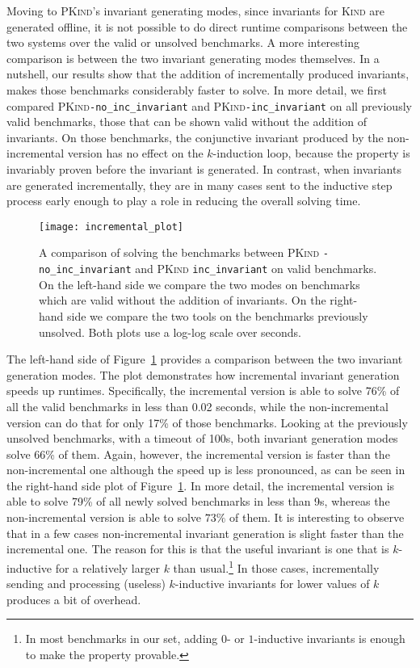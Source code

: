 \documentclass[submission,copyright,creativecommons]{eptcs}
\newcommand{\Kind}{\textrm{\textsc{Kind}}\xspace}
\newcommand{\PKind}{\textrm{\textsc{PKind}}\xspace}
\begin{document}
Moving to \PKind's invariant generating modes,
since invariants for \Kind are generated offline,
it is not possible to do direct runtime comparisons 
between the two systems over the valid or unsolved benchmarks.
A more interesting comparison is between 
the two invariant generating modes themselves.
In a nutshell, our results show that 
the addition of incrementally produced invariants, 
makes those benchmarks considerably faster to solve.  
In more detail,
we first compared \PKind \texttt{\small -no\_inc\_invariant} and 
\PKind \texttt{\small -inc\_invariant} on all previously valid benchmarks,
those that can be shown valid without the addition of invariants. 
On those benchmarks, the conjunctive invariant produced 
by the non-incremental version has no effect on the $k$-induction loop,
because the property is invariably proven before the invariant is generated.
In contrast, when invariants are generated incrementally, 
they are in many cases sent to the inductive step process
early enough to play a role in reducing the overall solving time.




\begin{figure}[t]
\centering
\texttt{[image: incremental\_plot]} 
\caption{ A comparison of solving the benchmarks between \PKind
  \texttt{\small -no\_inc\_invariant} and \PKind
  \texttt{\small inc\_invariant} on valid benchmarks. On the left-hand side
  we compare the two modes on benchmarks which are valid without the
  addition of invariants.  On the right-hand side we compare the two
  tools on the benchmarks previously unsolved.
  Both plots use a log-log scale over seconds.}
\label{fig:incremental}
\end{figure}

The left-hand side of Figure~\ref{fig:incremental} provides a
comparison between the two invariant generation modes. The plot demonstrates how
incremental invariant generation speeds up runtimes. 
Specifically, the incremental version is able to solve
76\% of all the valid benchmarks in less than 0.02 seconds, while the
non-incremental version can do that for only 17\% of those benchmarks.
Looking at the previously unsolved benchmarks, with a timeout of 100s, 
both invariant generation modes solve 66\% of them.  Again, however, the
incremental version is faster than the non-incremental one
although the speed up is less pronounced,
as can be seen in the right-hand side plot of Figure~\ref{fig:incremental}. 
In more detail, the incremental version is able to solve 79\% of all newly
solved benchmarks in less than 9s, whereas the non-incremental version
is able to solve $73\%$ of them.  
It is interesting to observe that in a few
cases non-incremental invariant generation is slight faster than the
incremental one.  The reason for this is that the useful invariant is
one that is $k$-inductive for a relatively larger $k$ than
usual.\footnote{ In most benchmarks in our set, adding $0$- or
  $1$-inductive invariants is enough to make the property provable.  }
In those cases, incrementally sending and processing (useless)
$k$-inductive invariants for lower values of $k$ produces a bit of
overhead.
\end{document}
